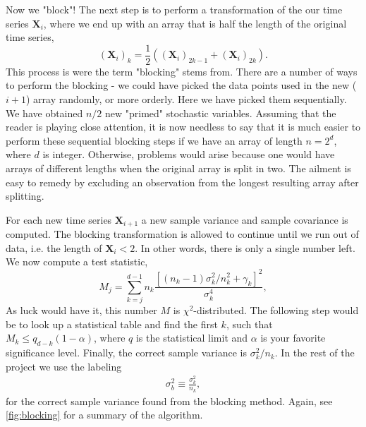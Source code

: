 \documentclass[
    a4paper, aps, twocolumn, floatfix, superscriptaddress,
    nofootinbib]{revtex4-1}
\newcommand{\1}{\mathds{1}}
\begin{document}
            Now we "block"! The next step is to perform a transformation of the
            our time series $\mathbf{X}_i$, where we end up with an array that
            is half the length of the original time series,
            \begin{equation}
                (\mathbf{X}_i)_k
                = \frac{1}{2}\left((\mathbf{X}_i)_{2k-1}
                + (\mathbf{X}_i)_{2k} \right).
            \end{equation}
            This process is were the term "blocking" stems from. There are a
            number of ways to perform the blocking - we could have picked the
            data points used in the new ($i+1$) array randomly, or more orderly.
            Here we have picked them sequentially. We have obtained $n/2$ new
            "primed" stochastic variables. Assuming that the reader is playing
            close attention, it is now needless to say that it is much easier to
            perform these sequential blocking steps if we have an array of
            length $n= 2^d$, where $d$ is integer. Otherwise, problems would
            arise because one would have arrays of different lengths when the
            original array is split in two. The ailment is easy to remedy by
            excluding an observation from the longest resulting array after
            splitting.

            For each new time series $\mathbf{X}_{i+1}$ a new sample variance
            and sample covariance is computed.  The blocking transformation is
            allowed to continue until we run out of data, i.e. the length of
            $\mathbf{X}_i < 2$. In other words, there is only a single number
            left.  We now compute a test statistic,
            \begin{equation}
                M_j
                = \sum_{k=j}^{d-1}
                n_k \frac{\left[(n_k - 1)
                \sigma^2_k/n_k^2 + \gamma_k\right] ^2}{\sigma_k^4},
            \end{equation}
            As luck would have it, this number $M$ is   $\chi^2$-distributed.
            The following step would be to look up a statistical table and find
            the first $k$, such that $M_k \leq q_{d-k}(1-\alpha)$, where $q$ is
            the statistical limit and $\alpha$ is your favorite  significance
            level. Finally, the correct sample variance is $\sigma_k^2/n_k$. In
            the rest of the project we use the labeling
            \begin{align}
                \sigma_b^2 \equiv \frac{\sigma_k^2}{n_k},
            \end{align}
            for the correct sample variance found from the blocking method.
            Again, see \autoref{fig:blocking} for a summary of the algorithm.
\end{document}
